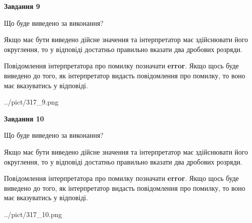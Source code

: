 \documentclass[12pt, ukrainian]{article}
\begin{document}
{\begin {Large}
{\begin {center}\textbf{Завдання 9}\end {center}}\par
Що буде виведено за виконання? \par

Якщо має бути виведено дійсне значення та інтерпретатор має здійснювати його округлення, 
то у відповіді достатньо правильно вказати два дробових розряди.

Повідомлення інтерпретатора про помилку позначати \textbf{error}.
Якщо щось буде виведено до того, як інтерпретатор видасть повідомлення про помилку, 
то воно має вказуватись у відповіді. \par

\begin{center}
	{../pict/317_9.png}
\end{center}
\newpage

{\begin {center}\textbf{Завдання 10}\end {center}}\par
Що буде виведено за виконання? \par

Якщо має бути виведено дійсне значення та інтерпретатор має здійснювати його округлення, 
то у відповіді достатньо правильно вказати два дробових розряди.

Повідомлення інтерпретатора про помилку позначати \textbf{error}.
Якщо щось буде виведено до того, як інтерпретатор видасть повідомлення про помилку, 
то воно має вказуватись у відповіді. \par

\begin{center}
	{../pict/317_10.png}
\end{center}
\newpage

\end {Large}}
\end{document}
